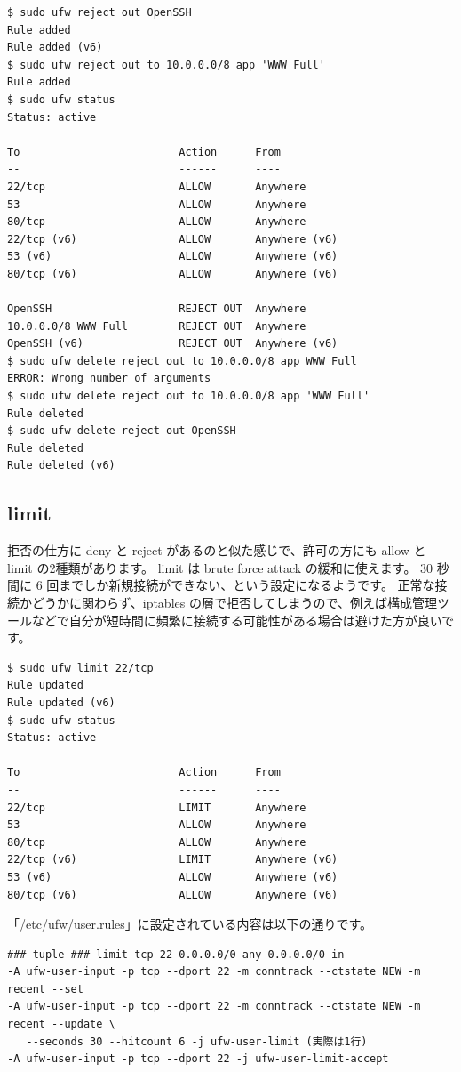 \documentclass[mingoth,a4paper]{jsarticle}
\begin{document}
\begin{verbatim}
$ sudo ufw reject out OpenSSH
Rule added
Rule added (v6)
$ sudo ufw reject out to 10.0.0.0/8 app 'WWW Full'
Rule added
$ sudo ufw status
Status: active

To                         Action      From
--                         ------      ----
22/tcp                     ALLOW       Anywhere
53                         ALLOW       Anywhere
80/tcp                     ALLOW       Anywhere
22/tcp (v6)                ALLOW       Anywhere (v6)
53 (v6)                    ALLOW       Anywhere (v6)
80/tcp (v6)                ALLOW       Anywhere (v6)

OpenSSH                    REJECT OUT  Anywhere
10.0.0.0/8 WWW Full        REJECT OUT  Anywhere
OpenSSH (v6)               REJECT OUT  Anywhere (v6)
$ sudo ufw delete reject out to 10.0.0.0/8 app WWW Full
ERROR: Wrong number of arguments
$ sudo ufw delete reject out to 10.0.0.0/8 app 'WWW Full'
Rule deleted
$ sudo ufw delete reject out OpenSSH
Rule deleted
Rule deleted (v6)
\end{verbatim}

\subsection{limit}

拒否の仕方に deny と reject があるのと似た感じで、許可の方にも allow と limit の2種類があります。
limit は brute force attack の緩和に使えます。
30 秒間に 6 回までしか新規接続ができない、という設定になるようです。
正常な接続かどうかに関わらず、iptables の層で拒否してしまうので、例えば構成管理ツールなどで自分が短時間に頻繁に接続する可能性がある場合は避けた方が良いです。

\begin{verbatim}
$ sudo ufw limit 22/tcp
Rule updated
Rule updated (v6)
$ sudo ufw status
Status: active

To                         Action      From
--                         ------      ----
22/tcp                     LIMIT       Anywhere
53                         ALLOW       Anywhere
80/tcp                     ALLOW       Anywhere
22/tcp (v6)                LIMIT       Anywhere (v6)
53 (v6)                    ALLOW       Anywhere (v6)
80/tcp (v6)                ALLOW       Anywhere (v6)
\end{verbatim}

「/etc/ufw/user.rules」に設定されている内容は以下の通りです。

\begin{verbatim}
### tuple ### limit tcp 22 0.0.0.0/0 any 0.0.0.0/0 in
-A ufw-user-input -p tcp --dport 22 -m conntrack --ctstate NEW -m recent --set
-A ufw-user-input -p tcp --dport 22 -m conntrack --ctstate NEW -m recent --update \
   --seconds 30 --hitcount 6 -j ufw-user-limit (実際は1行)
-A ufw-user-input -p tcp --dport 22 -j ufw-user-limit-accept
\end{verbatim}
\end{document}
